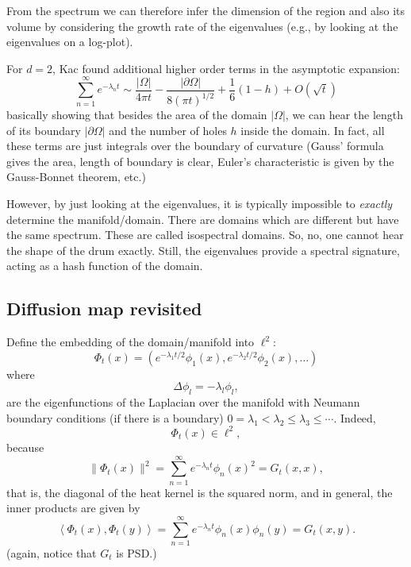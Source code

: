 From the spectrum we can therefore infer the dimension of the region and also its volume by considering the growth rate of the eigenvalues (e.g., by looking at the eigenvalues on a log-plot).

For $d=2$, Kac found additional higher order terms in the asymptotic expansion:
\begin{equation*}
\sum_{n=1}^\infty e^{-\lambda_n t} \sim \frac{|\Omega|}{4\pi t}-\frac{|\partial\Omega|}{8(\pi t)^{1/2}}+\frac{1}{6}(1-h)+O(\sqrt{t})
\end{equation*}
basically showing that besides the area of the domain $|\Omega|$, we can hear the length of its boundary $|\partial \Omega|$ and the number of holes $h$ inside the domain. In fact, all these terms are just integrals over the boundary of curvature (Gauss' formula gives the area, length of boundary is clear, Euler's characteristic is given by the Gauss-Bonnet theorem, etc.)

However, by just looking at the eigenvalues, it is typically impossible to {\textit{exactly}} determine the manifold/domain. There are domains which are different but have the same spectrum. These are called isospectral domains. So, no, one cannot hear the shape of the drum exactly. Still, the eigenvalues provide a spectral signature, acting as a hash function of the domain.\\

\subsection{Diffusion map revisited}
Define the embedding of the domain/manifold into $\ell^2$:
\begin{equation*}
\Phi_t(x) = \left(e^{-\lambda_1 t/2}\phi_1(x),e^{-\lambda_2 t/2}\phi_2(x), \ldots \right)
\end{equation*}
where
\begin{equation}
\Delta \phi_l = -\lambda_l \phi_l,
\end{equation}
are the eigenfunctions of the Laplacian over the manifold with Neumann boundary conditions (if there is a boundary) $0 = \lambda_1 < \lambda_2 \leq \lambda_3 \leq \cdots$.
Indeed,
\begin{equation*}
\Phi_t(x)\in\ell^2,
\end{equation*}
because
$$\|\Phi_t(x)\|^2=\sum_{n=1}^\infty e^{-\lambda_n t}\phi_n(x)^2 = G_t(x,x),$$ that is, the diagonal of the heat kernel is the squared norm, and in general, the inner products are given by $$\left\langle\Phi_t(x),\Phi_t(y)\right\rangle = \sum_{n=1}^\infty e^{-\lambda_n t}\phi_n(x)\phi_n(y) = G_t(x,y).$$
(again, notice that $G_t$ is PSD.)

